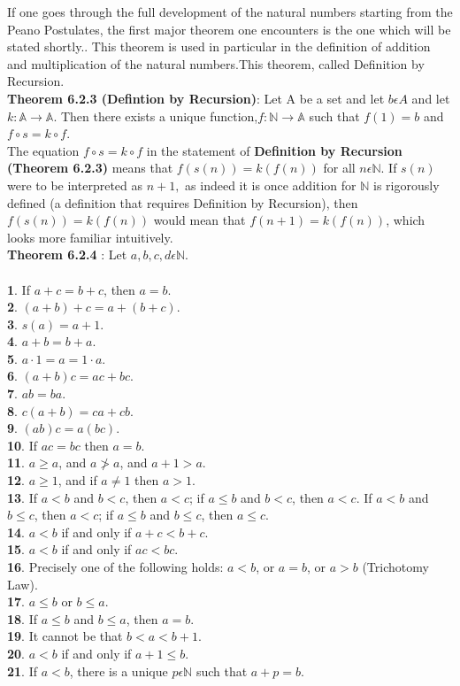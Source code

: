 \documentclass[a4paper,english,12pt]{article}
\begin{document}
If one goes through the full development of the natural numbers starting from
the Peano Postulates, the first major theorem one encounters is the one which will be stated shortly.. This theorem is used in particular in the definition of addition and multiplication of the natural numbers.This theorem, called Definition by Recursion.\\

{\bf Theorem 6.2.3 (Defintion by Recursion)}: Let A be a set and let $b\epsilon A$ and let $k:\mathbb{A}\rightarrow \mathbb{A}$. Then there exists a unique function,$f:\mathbb{N}\rightarrow \mathbb{A}$ such that $f(1)=b$ and $f \circ s=k \circ f$.\\
The equation $f \circ s=k \circ f$ in the statement of  {\bf Definition by Recursion (Theorem 6.2.3)} means that $f(s(n))=k(f(n))$ for all $n \epsilon \mathbb{N}$. If $s(n)$ were to be interpreted as $n+1,$ as indeed it is once addition for $\mathbb{N}$ is rigorously defined (a definition that requires Definition by Recursion), then $f(s(n))=k(f(n))$ would mean that $f(n+1)=k(f(n))$, which looks more familiar intuitively.\\

{\bf Theorem 6.2.4 }: Let $a,b,c,d \epsilon \mathbb{N}$.\\\\
{\bf 1}. If $a+c=b+c$, then $a=b$.\\
{\bf 2}. $(a + b)+c=a+(b + c)$.\\
{\bf 3}. $s(a)=a+1$.\\
{\bf 4}. $a+b=b+a$.\\
{\bf 5}. $a·1=a=1·a$.\\
{\bf 6}. $(a+b)c=ac+bc$.\\
{\bf 7}. $ab = ba$.\\
{\bf 8}. $c(a+b)=ca+cb$.\\
{\bf 9}. $(ab)c = a(bc)$.\\
{\bf 10}. If $ac=bc$ then $a=b$.\\
{\bf 11}. $a\geq a$, and $a\ngtr a$, and $a+1>a$.\\
{\bf 12}. $a\geq1$, and if $a\neq1$ then $a>1$.\\
{\bf 13}. If $a<b$ and $b<c$, then $a<c$; if $a\leq b$ and $b<c$, then $a<c$. If $a<b$ and $b\leq c$, then $a<c$; if $a\leq b$ and $b\leq c$, then $a\leq c$.\\
{\bf 14}. $a<b$ if and only if $a+c<b+c$.\\
{\bf 15}. $a<b$ if and only if $ac<bc$.\\
{\bf 16}. Precisely one of the following holds: $a<b$, or $a=b$, or $a>b$  (Trichotomy Law).\\
{\bf 17}. $a \leq b$ or $b \leq a$.\\
{\bf 18}. If $a \leq b$ and $b \leq a$, then $a=b$.\\
{\bf 19}. It cannot be that $b<a<b+1$.\\
{\bf 20}. $a<b$ if and only if $a+1 \leq b$.\\
{\bf 21}. If $a<b$, there is a unique $p\epsilon\mathbb{N}$ such that $a+p=b$.\\
\end{document}
